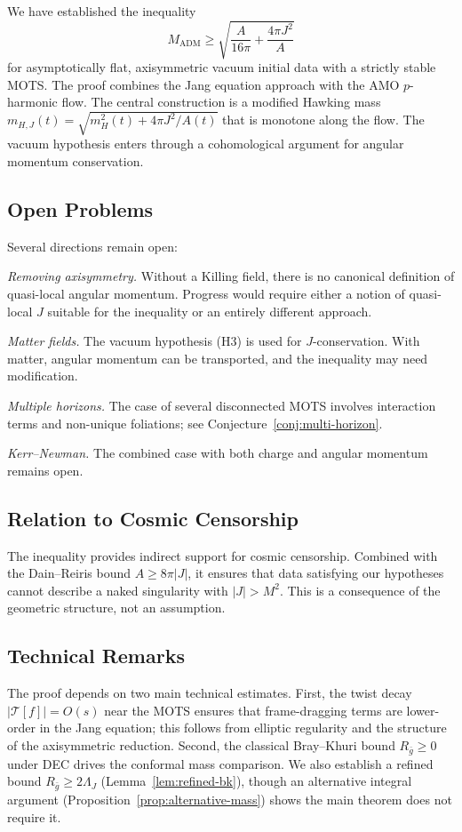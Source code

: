 \documentclass[12pt]{article}
\theoremstyle{plain}
\theoremstyle{definition}
\theoremstyle{remark}
\newcommand{\ADM}{\mathrm{ADM}}
\newcommand{\bg}{\bar{g}}
\begin{document}
We have established the inequality
\[
M_{\ADM} \geq \sqrt{\frac{A}{16\pi} + \frac{4\pi J^2}{A}}
\]
for asymptotically flat, axisymmetric vacuum initial data with a strictly stable MOTS. The proof combines the Jang equation approach with the AMO $p$-harmonic flow. The central construction is a modified Hawking mass $m_{H,J}(t) = \sqrt{m_H^2(t) + 4\pi J^2/A(t)}$ that is monotone along the flow. The vacuum hypothesis enters through a cohomological argument for angular momentum conservation.

\subsection{Open Problems}

Several directions remain open:

\emph{Removing axisymmetry.} Without a Killing field, there is no canonical definition of quasi-local angular momentum. Progress would require either a notion of quasi-local $J$ suitable for the inequality or an entirely different approach.

\emph{Matter fields.} The vacuum hypothesis (H3) is used for $J$-conservation. With matter, angular momentum can be transported, and the inequality may need modification.

\emph{Multiple horizons.} The case of several disconnected MOTS involves interaction terms and non-unique foliations; see Conjecture~\ref{conj:multi-horizon}.

\emph{Kerr--Newman.} The combined case with both charge and angular momentum remains open.

\subsection{Relation to Cosmic Censorship}

The inequality provides indirect support for cosmic censorship. Combined with the Dain--Reiris bound $A \geq 8\pi|J|$, it ensures that data satisfying our hypotheses cannot describe a naked singularity with $|J| > M^2$. This is a consequence of the geometric structure, not an assumption.
\subsection{Technical Remarks}

The proof depends on two main technical estimates. First, the twist decay $|\mathcal{T}[f]| = O(s)$ near the MOTS ensures that frame-dragging terms are lower-order in the Jang equation; this follows from elliptic regularity and the structure of the axisymmetric reduction. Second, the classical Bray--Khuri bound $R_{\bg} \geq 0$ under DEC drives the conformal mass comparison. We also establish a refined bound $R_{\bg} \geq 2\Lambda_J$ (Lemma~\ref{lem:refined-bk}), though an alternative integral argument (Proposition~\ref{prop:alternative-mass}) shows the main theorem does not require it.
\end{document}
